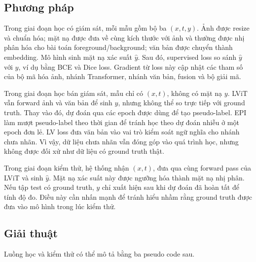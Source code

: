 \subsection*{Phương pháp}

Trong giai đoạn học có giám sát, mỗi mẫu gồm bộ ba \((x,t,y)\). Ảnh được resize và chuẩn hóa; mặt nạ được đưa về cùng kích thước với ảnh và thường được nhị phân hóa cho bài toán foreground/background; văn bản được chuyển thành embedding. Mô hình sinh mặt nạ xác suất \(\hat{y}\). Sau đó, supervised loss so sánh \(\hat{y}\) với \(y\), ví dụ bằng BCE và Dice loss. Gradient từ loss này cập nhật các tham số của bộ mã hóa ảnh, nhánh Transformer, nhánh văn bản, fusion và bộ giải mã.

Trong giai đoạn học bán giám sát, mẫu chỉ có \((x,t)\), không có mặt nạ \(y\). LViT vẫn forward ảnh và văn bản để sinh \(\hat{y}\), nhưng không thể so trực tiếp với ground truth. Thay vào đó, dự đoán qua các epoch được dùng để tạo pseudo-label. EPI làm mượt pseudo-label theo thời gian để tránh học theo dự đoán nhiễu ở một epoch đơn lẻ. LV loss đưa văn bản vào vai trò kiểm soát ngữ nghĩa cho nhánh chưa nhãn. Vì vậy, dữ liệu chưa nhãn vẫn đóng góp vào quá trình học, nhưng không được đối xử như dữ liệu có ground truth thật.

Trong giai đoạn kiểm thử, hệ thống nhận \((x,t)\), đưa qua cùng forward pass của LViT và sinh \(\hat{y}\). Mặt nạ xác suất này được ngưỡng hóa thành mặt nạ nhị phân. Nếu tập test có ground truth, \(y\) chỉ xuất hiện sau khi dự đoán đã hoàn tất để tính độ đo. Điều này cần nhấn mạnh để tránh hiểu nhầm rằng ground truth được đưa vào mô hình trong lúc kiểm thử.

\subsection*{Giải thuật}

Luồng học và kiểm thử có thể mô tả bằng ba pseudo code sau.

